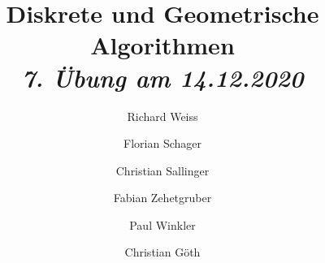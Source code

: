 \documentclass{beamer}
\title
{
  Diskrete und Geometrische Algorithmen \\
  \vspace{4pt}
  \normalsize
  \textit{7. Übung am 14.12.2020}
}
\author
{
  Richard Weiss
  \and
  Florian Schager
  \and
  Christian Sallinger
  \and
  Fabian Zehetgruber
  \and
  Paul Winkler
  \and
  Christian Göth
}
\date{}
\begin{document}
\frame{\titlepage}

\begin{frame}[t]
    \begin{adjustwidth}{-1.5cm}{0cm}
        
    \end{adjustwidth}
\end{frame}

\begin{frame}[t]
    \begin{adjustwidth}{-1.5cm}{0cm}
        
    \end{adjustwidth}
\end{frame}

\begin{frame}[t]
    \begin{adjustwidth}{-1.5cm}{0cm}
        
    \end{adjustwidth}
\end{frame}

\begin{frame}[t]
    \begin{adjustwidth}{-1.5cm}{0cm}
        
    \end{adjustwidth}
\end{frame}

\begin{frame}[t]
    \begin{adjustwidth}{-1.5cm}{0cm}
        
    \end{adjustwidth}
\end{frame}

\begin{frame}[t]
    \begin{adjustwidth}{-1.5cm}{0cm}
        
    \end{adjustwidth}
\end{frame}

\begin{frame}[t]
    \begin{adjustwidth}{-1.5cm}{0cm}
        
    \end{adjustwidth}
\end{frame}

\begin{frame}[t]
    \begin{adjustwidth}{-1.5cm}{0cm}
        
    \end{adjustwidth}
\end{frame}
\end{document}
